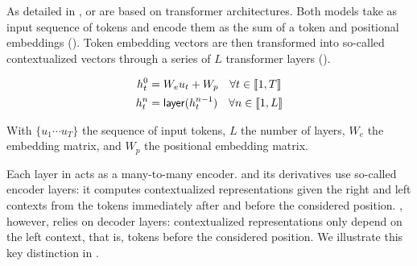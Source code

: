 
As detailed in , \gpt or \bert are based on transformer architectures. Both models take as input sequence of tokens and encode them as the sum of a token and positional embeddings (). Token embedding vectors are then transformed into so-called contextualized vectors through a series of $L$ transformer layers ().

\begin{align}
    h^0_t &= W_eu_t + W_p \quad \forall t \in \llbracket 1, T \rrbracket \labeq{generative:embeddings} \\
    h^n_t &= \mathsf{layer}(h^{n-1}_t) \quad \forall n \in \llbracket 1, L \rrbracket \labeq{generative:layers-eq}
\end{align}

With $\{u_1 \cdots u_T\}$ the sequence of input tokens, $L$ the number of layers, $W_e$ the embedding matrix, and $W_p$ the positional embedding matrix.


Each layer in  acts as a many-to-many encoder. \bert and its derivatives use so-called encoder layers: it computes contextualized representations given the right and left contexts \ie from the tokens immediately after and before the considered position. \gpt, however, relies on decoder layers: contextualized representations only depend on the left context, that is, tokens before the considered position. We illustrate this key distinction in .

